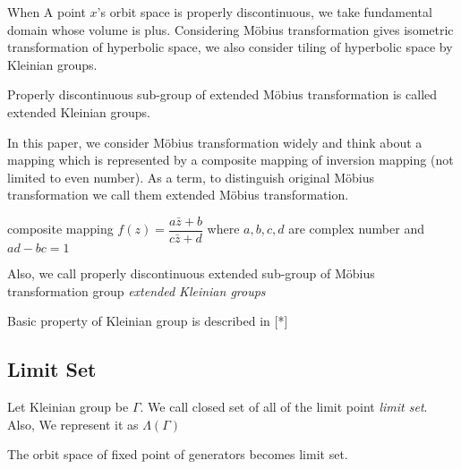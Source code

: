 When A point $x$'s orbit space is properly discontinuous, we take
fundamental domain whose volume is plus.
Considering M\"obius transformation gives isometric transformation of
hyperbolic space, we also consider tiling of hyperbolic space by
Kleinian groups. 

Properly discontinuous sub-group of extended M\"obius transformation
is called extended Kleinian groups.

In this paper, we consider M\"obius transformation widely and
think about a mapping which is represented by a  composite mapping of
inversion mapping (not limited to even number).
As a term, to distinguish original M\"obius transformation
we call them extended M\"obius transformation.

composite mapping $f(z)=\dfrac{a{\bar{z}}+b}{c{\bar{z}}+d}$ where
$a, b, c, d$ are complex number and $ad-bc = 1$


Also, we call properly discontinuous extended sub-group of M\"obius
 transformation group \textit{extended Kleinian groups}

Basic property of Kleinian group is described in [*]

\subsection{Limit Set}

Let Kleinian group be $\Gamma$.
We call closed set of all of the limit point \textit{limit set}.
Also, We represent it as $\Lambda(\Gamma)$

The orbit space of fixed point of generators becomes limit set.